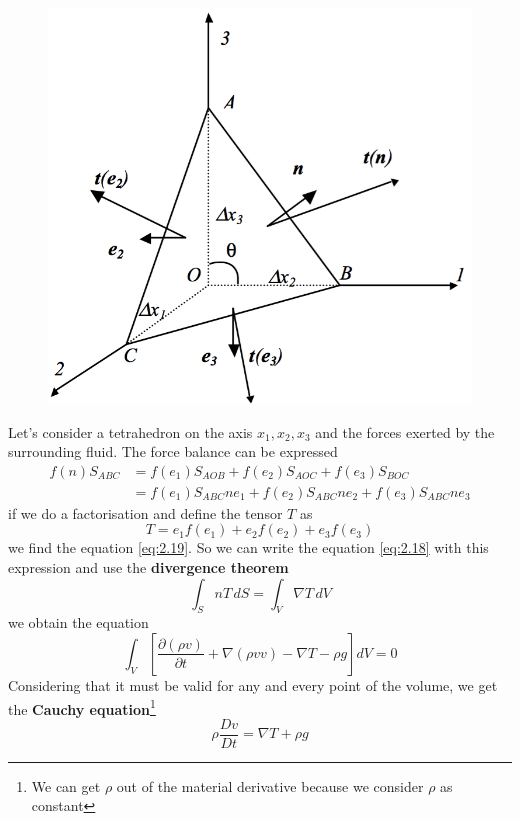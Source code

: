 		\begin{figure}
		\vspace{-5mm}
		\includegraphics[scale=0.4]{ch2/4}
		\end{figure}
		Let's consider a tetrahedron on the axis $x_1,x_2,x_3$ and the forces exerted by the surrounding fluid. The force balance can be expressed 
		\begin{equation}
		\begin{aligned}
			f(n) S_{ABC} &= f(e_1) S_{AOB} + f(e_2) S_{AOC} + f(e_3) S_{BOC} \\
			&= f(e_1) S_{ABC} n e_1 + f(e_2) S_{ABC} n e_2 + f(e_3) S_{ABC} n e_3
			\end{aligned}
		\end{equation}
		if we do a factorisation and define the tensor $T$ as
		\begin{equation}
			T = e_1f(e_1)+e_2f(e_2)+e_3f(e_3)
		\end{equation}
		we find the equation \autoref{eq:2.19}. So we can write the equation \autoref{eq:2.18} with this expression and use the \textbf{divergence theorem}
		\begin{equation}
			\int _S nT \, dS = \int _V \nabla T \, dV 
		\end{equation}
		we obtain the equation 
		\begin{equation}
			\int _V \left[ \frac{\partial (\rho v)}{\partial t} + \nabla (\rho vv) - \nabla T - \rho g \right] dV = 0
		\end{equation}
		Considering that it must be valid for any and every point of the volume, we get the \textbf{Cauchy equation}\footnote{We can get $\rho$ out of the material derivative because we consider $\rho$ as constant}
		\begin{equation}
			\rho \frac{Dv}{Dt} = \nabla T + \rho g
			\label{eq:cauchy}
		\end{equation}

